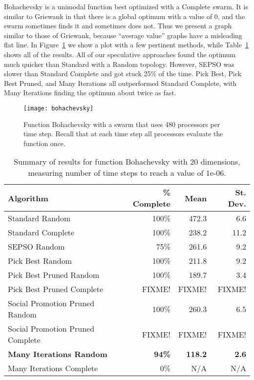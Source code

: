 \documentclass[smallcondensed]{svjour3}
\newcommand{\fig}[1]{Figure~\ref{fig:#1}}
\newcommand{\tabref}[1]{Table~\ref{tab:#1}}
\begin{document}
Bohachevsky is a unimodal function best optimized with a Complete swarm.  It is
similar to Griewank in that there is a global optimum with a value of 0, and
the swarm sometimes finds it and sometimes does not.  Thus we present a graph
similar to those of Griewank, because ``average value'' graphs have a
misleading flat line.  In \fig{bohachevsky} we show a plot with a few pertinent
methods, while \tabref{bohachevsky-20} shows all of the results.  All of our
speculative approaches found the optimum much quicker than Standard with a
Random topology.  However, SEPSO was slower than Standard Complete and got
stuck 25\% of the time.  Pick Best, Pick Best Pruned, and Many Iterations all
outperformed Standard Complete, with Many Iterations finding the optimum about
twice as fast.

\begin{figure}
  \centering
  \texttt{[image: bohachevsky]}
  \caption{Function Bohachevsky with a swarm that uses 480 processors per time
  step.  Recall that at each time step all processors evaluate the function
  once.}
  \label{fig:bohachevsky}
\end{figure}

\begin{table}
  \caption{Summary of results for function Bohachevsky with 20 dimensions,
  measuring number of time steps to reach a value of 1e-06.}
  \label{tab:bohachevsky-20}
  \centering
  \begin{tabular}{|l|r|r|r|}
  \hline
  Algorithm&\% Complete&Mean&St. Dev.\\
  \hline
  \hline
  Standard Random&100\%&472.3&6.6\\
  \hline
  Standard Complete&100\%&238.2&11.2\\
  \hline
  SEPSO Random&75\%&261.6&9.2\\
  \hline
  Pick Best Random&100\%&211.8&9.2\\
  \hline
  Pick Best Pruned Random&100\%&189.7&3.4\\
  \hline
  Pick Best Pruned Complete&FIXME!&FIXME!&FIXME!\\
  \hline
  Social Promotion Pruned Random&100\%&260.3&6.5\\
  \hline
  Social Promotion Pruned Complete&FIXME!&FIXME!&FIXME!\\
  \hline
  \textbf{Many Iterations Random}&\textbf{94\%}&\textbf{118.2}&\textbf{2.6}\\
  \hline
  Many Iterations Complete&0\%&N/A&N/A\\
  \hline
  \end{tabular}
\end{table}
\end{document}
